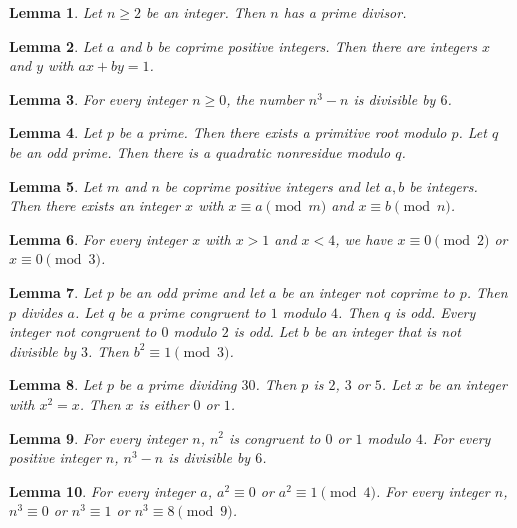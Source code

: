 \documentclass{article}
\newtheorem{lemma}{Lemma}
\begin{document}
\begin{lemma}\label{prime-divisor}
Let $n\ge2$ be an integer. Then $n$ has a prime divisor.
\end{lemma}

\begin{lemma}\label{bezout}
Let $a$ and $b$ be coprime positive integers. Then there are integers $x$ and $y$ with $ax+by=1$.
\end{lemma}

\begin{lemma}\label{six}
For every integer $n\ge0$, the number $n^3-n$ is divisible by $6$.
\end{lemma}

\begin{lemma}\label{primitive-root}
Let $p$ be a prime. Then there exists a primitive root modulo $p$. Let $q$ be an odd prime. Then there is a quadratic nonresidue modulo $q$.
\end{lemma}

\begin{lemma}\label{chinese-remainder}
Let $m$ and $n$ be coprime positive integers and let $a,b$ be integers. Then there exists an integer $x$ with $x\equiv a\pmod m$ and $x\equiv b\pmod n$.
\end{lemma}

\begin{lemma}\label{two-conditions}
For every integer $x$ with $x>1$ and $x<4$, we have $x\equiv0\pmod2$ or $x\equiv0\pmod3$.
\end{lemma}

\begin{lemma}\label{negated-modifiers}
Let $p$ be an odd prime and let $a$ be an integer not coprime to $p$. Then $p$ divides $a$. Let $q$ be a prime congruent to $1$ modulo $4$. Then $q$ is odd. Every integer not congruent to $0$ modulo $2$ is odd. Let $b$ be an integer that is not divisible by $3$. Then $b^2\equiv 1\pmod 3$.
\end{lemma}

\begin{lemma}\label{one-of-values}
Let $p$ be a prime dividing $30$. Then $p$ is $2$, $3$ or $5$. Let $x$ be an integer with $x^2=x$. Then $x$ is either $0$ or $1$.
\end{lemma}

\begin{lemma}\label{two-residues}
For every integer $n$, $n^2$ is congruent to $0$ or $1$ modulo $4$. For every positive integer $n$, $n^3-n$ is divisible by $6$.
\end{lemma}

\begin{lemma}\label{shared-modulus}
For every integer $a$, $a^2\equiv0$ or $a^2\equiv1\pmod4$. For every integer $n$, $n^3\equiv0$ or $n^3\equiv1$ or $n^3\equiv8\pmod 9$.
\end{lemma}
\end{document}
